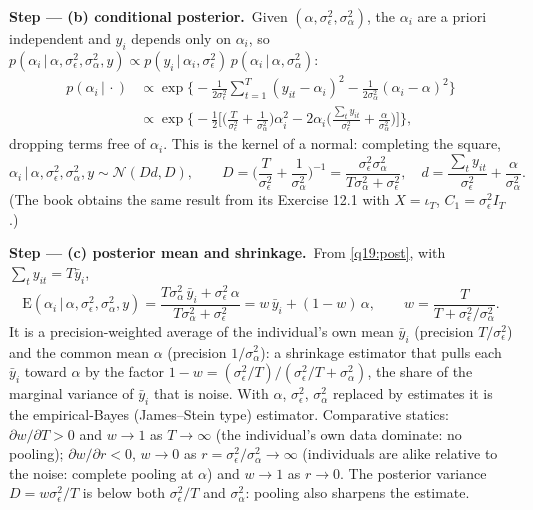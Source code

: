 \documentclass[11pt,a4paper]{article}
\numberwithin{equation}{questao}
\newcommand{\passo}[2]{\par\smallskip\noindent\textbf{Step --- #1.}~#2}
\newcommand{\E}{\mathrm{E}}
\newcommand{\N}{\mathcal{N}}
\begin{document}
\begin{sol}
\passo{(b) conditional posterior}{Given $(\alpha,\sigma_\epsilon^2,\sigma_\alpha^2)$, the $\alpha_i$ are a priori independent and $y_i$
depends only on $\alpha_i$, so $p(\alpha_i\,|\,\alpha,\sigma_\epsilon^2,\sigma_\alpha^2,y)\propto p(y_i\,|\,\alpha_i,\sigma_\epsilon^2)\,p(\alpha_i\,|\,\alpha,\sigma_\alpha^2)$:
\begin{align*}
p(\alpha_i\,|\,\cdot)&\propto\exp\Big\{-\frac{1}{2\sigma_\epsilon^2}\sum_{t=1}^T(y_{it}-\alpha_i)^2-\frac{1}{2\sigma_\alpha^2}(\alpha_i-\alpha)^2\Big\}\\
&\propto\exp\Big\{-\frac12\Big[\Big(\frac{T}{\sigma_\epsilon^2}+\frac{1}{\sigma_\alpha^2}\Big)\alpha_i^2-2\alpha_i\Big(\frac{\sum_ty_{it}}{\sigma_\epsilon^2}+\frac{\alpha}{\sigma_\alpha^2}\Big)\Big]\Big\},
\end{align*}
dropping terms free of $\alpha_i$. This is the kernel of a normal: completing the square,
\begin{equation}
\alpha_i\,|\,\alpha,\sigma_\epsilon^2,\sigma_\alpha^2,y\sim\N(Dd,D),\qquad
D=\Big(\frac{T}{\sigma_\epsilon^2}+\frac{1}{\sigma_\alpha^2}\Big)^{-1}=\frac{\sigma_\epsilon^2\sigma_\alpha^2}{T\sigma_\alpha^2+\sigma_\epsilon^2},\quad
d=\frac{\sum_ty_{it}}{\sigma_\epsilon^2}+\frac{\alpha}{\sigma_\alpha^2}. \label{q19:post}
\end{equation}
(The book obtains the same result from its Exercise 12.1 with $X=\iota_T$, $C_1=\sigma_\epsilon^2I_T$.)}

\passo{(c) posterior mean and shrinkage}{From \eqref{q19:post}, with $\sum_ty_{it}=T\bar y_i$,
\begin{equation}
\E(\alpha_i\,|\,\alpha,\sigma_\epsilon^2,\sigma_\alpha^2,y)=\frac{T\sigma_\alpha^2\,\bar y_i+\sigma_\epsilon^2\,\alpha}{T\sigma_\alpha^2+\sigma_\epsilon^2}
=w\,\bar y_i+(1-w)\,\alpha,\qquad w=\frac{T}{T+\sigma_\epsilon^2/\sigma_\alpha^2}. \label{q19:shrink}
\end{equation}
It is a precision-weighted average of the individual's own mean $\bar y_i$ (precision $T/\sigma_\epsilon^2$) and the common
mean $\alpha$ (precision $1/\sigma_\alpha^2$): a shrinkage estimator that pulls each $\bar y_i$ toward $\alpha$ by the factor
$1-w=(\sigma_\epsilon^2/T)/(\sigma_\epsilon^2/T+\sigma_\alpha^2)$, the share of the marginal variance of $\bar y_i$ that is noise.
With $\alpha$, $\sigma_\epsilon^2$, $\sigma_\alpha^2$ replaced by estimates it is the empirical-Bayes (James--Stein type) estimator.
Comparative statics: $\partial w/\partial T>0$ and $w\to1$ as $T\to\infty$ (the individual's own data dominate: no pooling);
$\partial w/\partial r<0$, $w\to0$ as $r=\sigma_\epsilon^2/\sigma_\alpha^2\to\infty$ (individuals are alike relative to the noise:
complete pooling at $\alpha$) and $w\to1$ as $r\to0$. The posterior variance $D=w\sigma_\epsilon^2/T$ is below both $\sigma_\epsilon^2/T$ and
$\sigma_\alpha^2$: pooling also sharpens the estimate.}


\end{sol}
\end{document}
